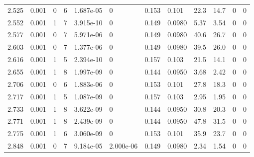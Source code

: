\documentclass[preview]{standalone}
\begin{document}
{{{\begin{tabular}{L{1.2cm}C{1.2cm} C{0.3cm}C{0.5cm} C{1.4cm}C{1.4cm} C{1.4cm}C{1.4cm} C{1.6cm}C{1.6cm} C{1.6cm}C{1.6cm}}
  2.525  &  0.001  & 0     &  6 &  1.687e-05  & 0  &  0.153&   0.101& 22.3 & 14.7   &  0 & 0  \\ 
  2.552  &  0.001  & 1     &  7 &  3.915e-10  & 0  &  0.149&   0.0980& 5.37 & 3.54   &  0 & 0  \\ 
  2.577  &  0.001  & 0     &  7 &  5.971e-06  & 0  &  0.149&   0.0980& 40.6 & 26.7   &  0 & 0  \\ 
  2.603  &  0.001  & 0     &  7 &  1.377e-06  & 0  &  0.149&   0.0980& 39.5 & 26.0   &  0 & 0  \\ 
  2.616  &  0.001  & 1     &  5 &  2.394e-10  & 0  &  0.157&   0.103& 21.5 & 14.1   &  0 & 0  \\ 
  2.655  &  0.001  & 1     &  8 &  1.997e-09  & 0  &  0.144&   0.0950& 3.68 & 2.42   &  0 & 0  \\ 
  2.706  &  0.001  & 0     &  6 &  1.883e-06  & 0  &  0.153&   0.101& 27.8 & 18.3   &  0 & 0  \\ 
  2.717  &  0.001  & 1     &  5 &  1.087e-09  & 0  &  0.157&   0.103& 2.95 & 1.95   &  0 & 0  \\ 
  2.733  &  0.001  & 1     &  8 &  3.622e-09  & 0  &  0.144&   0.0950& 30.8 & 20.3   &  0 & 0  \\ 
  2.771  &  0.001  & 1     &  8 &  2.439e-09  & 0  &  0.144&   0.0950& 47.8 & 31.5   &  0 & 0  \\ 
  2.775  &  0.001  & 1     &  6 &  3.060e-09  & 0  &  0.153&   0.101& 35.9 & 23.7   &  0 & 0  \\ 
  2.848  &  0.001  & 0     &  7 &  9.184e-05  & 2.000e-06  &  0.149&   0.0980& 2.34 & 1.54   &  0 & 0  \\ 
\hline 
\end{tabular} 

}}}
\end{document}
